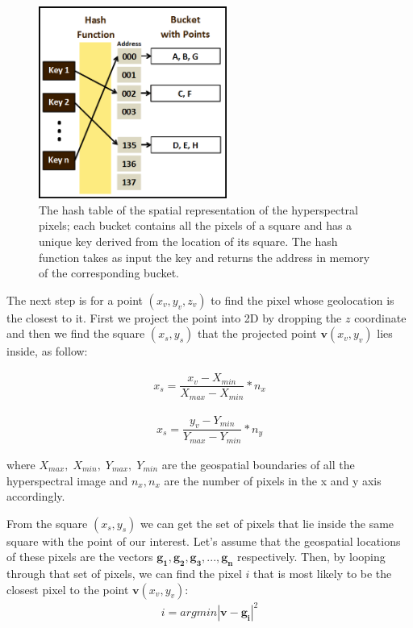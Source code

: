 \documentclass{subfiles}
\begin{document}
	 \begin{figure} [h!]
	 	\centering
	 	\includegraphics[width=0.55\textwidth]{img/HashTable}
	 	\caption[Hash Table]{The hash table of the spatial representation of the hyperspectral pixels; each bucket contains all the pixels of a square and  has a unique key derived from the location of its square. The hash function takes as input the key and returns the address in memory of the corresponding bucket. }
	 	\label{fig:HashTable}
	 \end{figure}
	
	\par The next step is for a point $(x_v, y_v, z_v)$ to find the pixel whose geolocation is the closest to it. First we project the point into 2D by dropping the $z$ coordinate and then we find the square $(x_s , y_s )$ that the projected point $\mathbf{v}(x_v , y_v)$ lies inside, as follow: 
	
    \begin{eqnarray}
	    x_s = \dfrac{x_v-X_{min}}{X_{max}-X_{min}} * n_x
    \end{eqnarray}
	
	 \begin{eqnarray}
	 x_s = \dfrac{y_v-Y_{min}}{Y_{max}-Y_{min}} * n_y
	 \end{eqnarray}
 
	\par where $X_{max},\; X_{min},\; Y_{max},\; Y_{min} $ are the geospatial boundaries of all the hyperspectral image and $n_x, n_x$ are the number of pixels in the x and y axis accordingly. 
	
	\par From the square $(x_s,y_s)$ we can get the set of pixels that lie inside the same square with the point of our interest. Let’s assume that the geospatial locations of these pixels are the vectors $\mathbf{g_1},\mathbf{g_2}, \mathbf{g_3}, ... , \mathbf{g_n}$ respectively. Then, by looping through that set of pixels, we can find the pixel $i$ that is most likely to be the closest pixel to the point $\mathbf{v}(x_v , y_v)$:
	\begin{eqnarray}
		i = argmin|\mathbf{v}-\mathbf{g_i}|^2
	\end{eqnarray}
	
\end{document}
